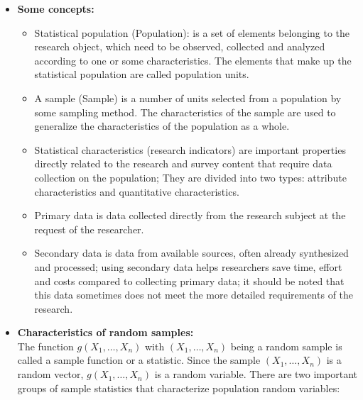 \documentclass{article}
\begin{document}
	\begin{itemize}
		\item \textbf {Some concepts:}
		\begin{itemize}
			
			\item Statistical population (Population): is a set of elements belonging to the research object, which need to be observed, collected and analyzed according to one or some characteristics. The elements that make up the statistical population are called population units.
			
			\item A sample (Sample) is a number of units selected from a population by some sampling method. The characteristics of the sample are used to generalize the characteristics of the population as a whole.
			
			\item Statistical characteristics (research indicators) are important properties directly related to the research and survey content that require data collection on the population; They are divided into two types: attribute characteristics and quantitative characteristics.
			
			\item Primary data is data collected directly from the research subject at the request of the researcher.
			
			\item Secondary data is data from available sources, often already synthesized and processed; using secondary data helps researchers save time, effort and costs compared to collecting primary data; it should be noted that this data sometimes does not meet the more detailed requirements of the research.
		\end{itemize}
		
		\item \textbf{Characteristics of random samples:}
		\\The function \( g(X_1, \ldots, X_n) \) with \( (X_1, \ldots, X_n) \) being a random sample is called a sample function or a statistic. Since the sample \( (X_1, \ldots, X_n) \) is a random vector, \( g(X_1, \ldots, X_n) \) is a random variable. There are two important groups of sample statistics that characterize population random variables:
		

\end{itemize}
\end{document}
